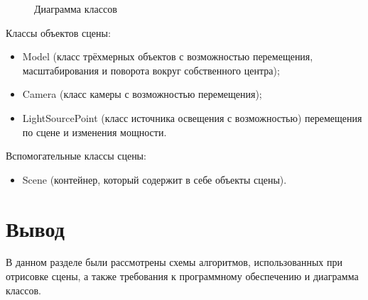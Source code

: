 \begin{figure}[ph!]
	\caption{Диаграмма классов}
	\label{fig:diag_class}
\end{figure}

Классы объектов сцены:
\begin{itemize}
	\item Model (класс трёхмерных объектов с возможностью перемещения, масштабирования и поворота вокруг собственного центра);
	\item Camera (класс камеры с возможностью перемещения);
	\item LightSourcePoint (класс источника освещения с возможностью)
	перемещения по сцене и изменения мощности.
\end{itemize}

Вспомогательные классы сцены:
\begin{itemize}
	\item  Scene (контейнер, который содержит в себе объекты сцены).
\end{itemize}

\section*{Вывод}
В данном разделе были рассмотрены схемы алгоритмов, использованных при отрисовке сцены, а также требования к программному обеспечению и диаграмма классов.


